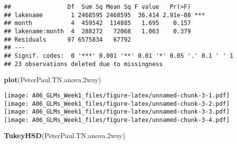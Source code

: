 \documentclass[]{article}
\newenvironment{Shaded}{\begin{snugshade}}{\end{snugshade}}
\newcommand{\FloatTok}[1]{\textcolor[rgb]{0.00,0.00,0.81}{#1}}
\newcommand{\KeywordTok}[1]{\textcolor[rgb]{0.13,0.29,0.53}{\textbf{#1}}}
\newcommand{\NormalTok}[1]{#1}
\begin{document}
\begin{verbatim}
##                Df  Sum Sq Mean Sq F value   Pr(>F)    
## lakename        1 2468595 2468595  36.414 2.91e-08 ***
## month           4  459542  114885   1.695    0.157    
## lakename:month  4  288272   72068   1.063    0.379    
## Residuals      97 6575834   67792                     
## ---
## Signif. codes:  0 '***' 0.001 '**' 0.01 '*' 0.05 '.' 0.1 ' ' 1
## 23 observations deleted due to missingness
\end{verbatim}

\begin{Shaded}
\begin{Highlighting}[]
\KeywordTok{plot}\NormalTok{(PeterPaul.TN.anova}\FloatTok{.2}\NormalTok{way)}
\end{Highlighting}
\end{Shaded}

\texttt{[image: A06\_GLMs\_Week1\_files/figure-latex/unnamed-chunk-3-1.pdf]}
\texttt{[image: A06\_GLMs\_Week1\_files/figure-latex/unnamed-chunk-3-2.pdf]}
\texttt{[image: A06\_GLMs\_Week1\_files/figure-latex/unnamed-chunk-3-3.pdf]}
\texttt{[image: A06\_GLMs\_Week1\_files/figure-latex/unnamed-chunk-3-4.pdf]}

\begin{Shaded}
\begin{Highlighting}[]
\KeywordTok{TukeyHSD}\NormalTok{(PeterPaul.TN.anova}\FloatTok{.2}\NormalTok{way)}
\end{Highlighting}
\end{Shaded}
\end{document}
